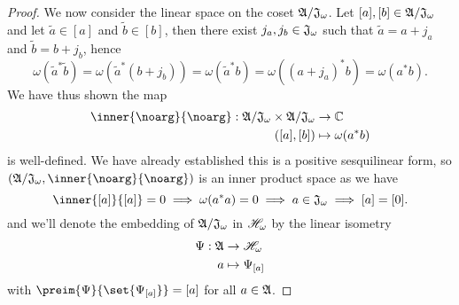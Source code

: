 \begin{proof}
    We now consider the linear space on the coset \(\mathfrak{A}/\mathfrak{J}_\omega\). Let \([a], [b] \in \mathfrak{A}/\mathfrak{J}_\omega\) and let \(\tilde{a} \in [a]\) and \(\tilde{b} \in [b]\), then there exist \(j_a, j_b \in \mathfrak{J}_\omega\) such that \(\tilde{a} = a + j_a\) and \(\tilde{b} = b + j_b\), hence
    \begin{equation*}
        \omega(\tilde{a}^*\tilde{b}) = \omega(\tilde{a}^*(b + j_b)) = \omega(\tilde{a}^*b) = \omega((a + j_a)^*b) = \omega(a^*b).
    \end{equation*}
    We have thus shown the map
    \begin{align*}
        \inner{\noarg}{\noarg} : \algebra{A}/\algebra{J}_\omega \times \algebra{A}/\algebra{J}_\omega &\to \mathbb{C}\\
        ([a],[b]) &\mapsto \omega(a^*b)
    \end{align*}
    is well-defined. We have already established this is a positive sesquilinear form, so \((\algebra{A}/\algebra{J}_\omega, \inner{\noarg}{\noarg})\) is an inner product space as we have
    \begin{equation*}
        \inner{[a]}{[a]} = 0 \implies \omega(a^*a) = 0 \implies a \in \algebra{J}_\omega \implies [a] = [0].
    \end{equation*}
     and we'll denote the embedding of \(\mathfrak{A}/\mathfrak{J}_\omega\) in \(\mathscr{H}_\omega\) by the linear isometry
    \begin{align*}
        \Psi : \mathfrak{A} &\to \mathscr{H}_\omega\\
                         a &\mapsto \Psi_{[a]}
    \end{align*}
    with \(\preim{\Psi}{\set{\Psi_{[a]}}} = [a]\) for all \(a \in \mathfrak{A}\).


\end{proof}

